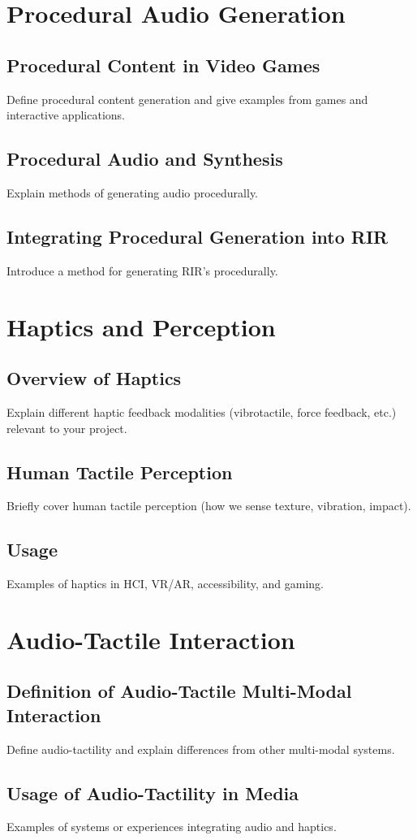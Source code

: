     \section{Procedural Audio Generation}
        \subsection{Procedural Content in Video Games} Define procedural content generation and give examples from games and interactive applications.
        \subsection{Procedural Audio and Synthesis} Explain methods of generating audio procedurally.
        \subsection{Integrating Procedural Generation into RIR} Introduce a method for generating RIR's procedurally.
    \section{Haptics and Perception}
        \subsection{Overview of Haptics} Explain different haptic feedback modalities (vibrotactile, force feedback, etc.) relevant to your project.
        \subsection{Human Tactile Perception} Briefly cover human tactile perception (how we sense texture, vibration, impact).
        \subsection{Usage} Examples of haptics in HCI, VR/AR, accessibility, and gaming.
    \section{Audio-Tactile Interaction}
        \subsection{Definition of Audio-Tactile Multi-Modal Interaction} Define audio-tactility and explain differences from other multi-modal systems.
        \subsection{Usage of Audio-Tactility in Media} Examples of systems or experiences integrating audio and haptics.